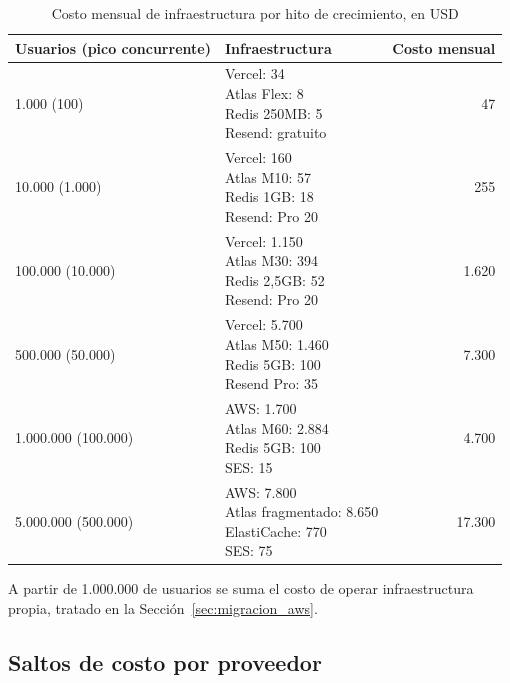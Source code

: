 \begin{table}[H]
  \centering
  \renewcommand{\arraystretch}{1.2}
  \begin{tabularx}{\textwidth}{l X r}
    \toprule
    Usuarios (pico concurrente) & Infraestructura & Costo mensual \\
    \midrule
    1.000 (100) & \makecell[l]{Vercel: 34 \\ Atlas Flex: 8 \\ Redis 250MB: 5 \\ Resend: gratuito} & 47 \\
    \rowcolor{gray!18}
    10.000 (1.000) & \makecell[l]{Vercel: 160 \\ Atlas M10: 57 \\ Redis 1GB: 18 \\ Resend: Pro 20} & 255 \\
    100.000 (10.000) & \makecell[l]{Vercel: 1.150 \\ Atlas M30: 394 \\ Redis 2,5GB: 52 \\ Resend: Pro 20} & 1.620 \\
    \rowcolor{gray!18}
    500.000 (50.000) & \makecell[l]{Vercel: 5.700 \\ Atlas M50: 1.460 \\ Redis 5GB: 100 \\ Resend Pro: 35} & 7.300 \\
    1.000.000 (100.000) & \makecell[l]{AWS: 1.700 \\ Atlas M60: 2.884 \\ Redis 5GB: 100 \\ SES: 15} & 4.700 \\
    \rowcolor{gray!18}
    5.000.000 (500.000) & \makecell[l]{AWS: 7.800 \\ Atlas fragmentado: 8.650 \\ ElastiCache: 770 \\ SES: 75} & 17.300 \\
    \bottomrule
  \end{tabularx}
  \caption{Costo mensual de infraestructura por hito de crecimiento, en USD}
  \label{tab:costo_hitos}
\end{table}

A partir de 1.000.000 de usuarios se suma el costo de operar infraestructura propia, tratado en la Sección~\ref{sec:migracion_aws}.

\subsection{Saltos de costo por proveedor}

